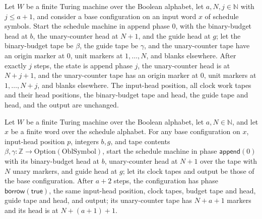 \begin{lemma}
\label{Complexity.setupCfg_append_prefix}
\leanok
{}
Let $W$ be a finite Turing machine over the Boolean alphabet, let $a,N,j\in\mathbb{N}$
with $j\le a+1$, and consider a base configuration on an input word $x$ of schedule
symbols. Start the schedule machine in append phase $0$, with the binary-budget head at
$b$, the unary-counter head at $N+1$, and the guide head at $g$; let the binary-budget
tape be $\beta$, the guide tape be $\gamma$, and the unary-counter tape have an origin
marker at $0$, unit markers at $1,\ldots,N$, and blanks elsewhere. After exactly $j$
steps, the state is append phase $j$, the unary-counter head is at $N+j+1$, and the
unary-counter tape has an origin marker at $0$, unit markers at $1,\ldots,N+j$, and
blanks elsewhere. The input-head position, all clock work tapes and their head
positions, the binary-budget tape and head, the guide tape and head, and the output are
unchanged.
\end{lemma}

\begin{lemma}
\label{Complexity.setupCfg_append}
\leanok
{}
Let $W$ be a finite Turing machine over the Boolean alphabet, let $a,N\in\mathbb{N}$,
and let $x$ be a finite word over the schedule alphabet. For any base configuration on
$x$, input-head position $p$, integers $b,g$, and tape contents
$\beta,\gamma\colon\mathbb{Z}\to\text{Option}(\text{OblSymbol})$, start the schedule
machine in phase $\mathsf{append}(0)$ with its binary-budget head at $b$, unary-counter
head at $N+1$ over the tape with $N$ unary markers, and guide head at $g$; let its clock
tapes and output be those of the base configuration. After $a+2$ steps, the
configuration has phase $\mathsf{borrow}(\mathsf{true})$, the same input-head position,
clock tapes, budget tape and head, guide tape and head, and output; its unary-counter
tape has $N+a+1$ markers and its head is at $N+(a+1)+1$.
\end{lemma}

